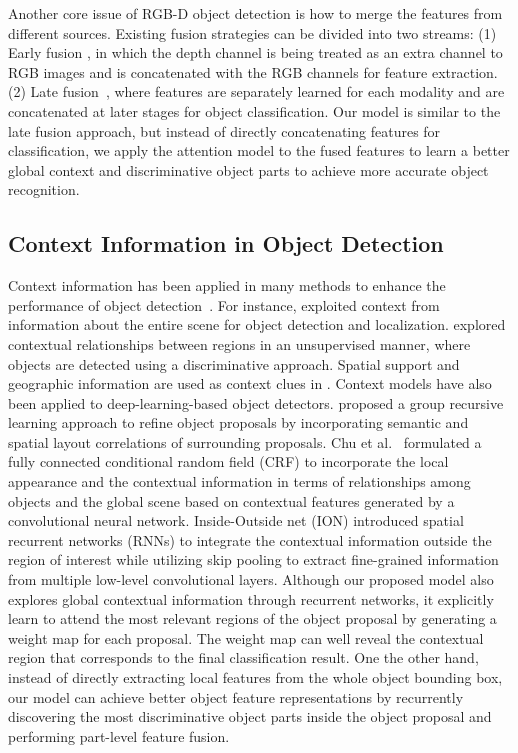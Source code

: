 \documentclass[journal]{IEEEtran}
\begin{document}
Another core issue of RGB-D object detection is how to merge the features from different sources. Existing fusion strategies can be divided into two streams: (1) Early fusion \cite{blum2012learned, bo2011object, bo2011depth}, in which the depth channel is being treated as an extra channel to RGB images and is concatenated with the RGB channels for feature extraction. (2) Late fusion~\cite{eitel2015multimodal, gupta2014learning, spinello2012leveraging, gupta2016cross}, where features are separately learned for each modality and are concatenated at later stages for object classification. Our model is similar to the late fusion approach, but instead of directly concatenating features for classification, we apply the attention model to the fused features to learn a better global context and discriminative object parts to achieve more accurate object recognition.

\subsection{Context Information in Object Detection}
Context information has been applied in many methods to enhance the performance of object detection~\cite{carbonetto2004statistical,li2016visual, divvala2009empirical, heitz2008learning, hoiem2005geometric, li2018contrast,torralba2010using}. For instance, \cite{torralba2010using} exploited context from information about the entire scene  for  object detection and localization. \cite{heitz2008learning} explored contextual relationships between regions in an unsupervised manner, where objects are detected using a discriminative approach. Spatial support and geographic information are used as context clues in \cite{divvala2009empirical}. Context models have also been applied to deep-learning-based object detectors. \cite{li2017multi} proposed a group recursive learning approach to refine object proposals by incorporating semantic and spatial layout correlations of surrounding proposals. Chu et al.~\cite{chu2016deep} formulated a fully connected conditional random field (CRF) to incorporate the local appearance and the contextual information in terms of relationships among objects and the global scene based on contextual features generated by a convolutional neural network. Inside-Outside net (ION) \cite{bell2016inside} introduced spatial recurrent networks (RNNs) to integrate the contextual information outside the region of interest while utilizing skip pooling to extract fine-grained information from multiple low-level convolutional layers. Although our proposed model also explores global contextual information through recurrent networks, it explicitly learn to attend the most relevant regions of the object proposal by generating a weight map for each proposal. The weight map can well reveal the contextual region that corresponds to the final classification result. One the other hand, instead of directly extracting local features from the whole object bounding box, our model can achieve better object feature representations by recurrently discovering the most discriminative object parts inside the object proposal and performing part-level feature fusion.
\end{document}
